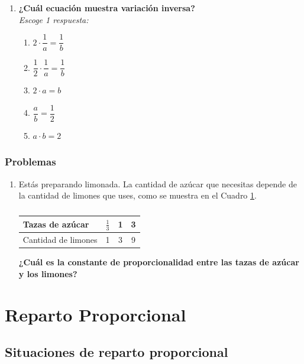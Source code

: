 \documentclass[11pt]{book}
\begin{document}
\begin{enumerate}[start=1]
  \item \textbf{¿Cuál ecuación muestra variación inversa?}\\
        \emph{Escoge 1 respuesta:}\\
        \begin{enumerate}
          \item $2\cdot \dfrac{1}{a}=\dfrac{1}{b}$
          \item $\dfrac{1}{2}\cdot \dfrac{1}{a}=\dfrac{1}{b}$
          \item $2\cdot a=b$
          \item $\dfrac{a}{b}=\dfrac{1}{2}$
          \item $a\cdot b=2$
        \end{enumerate}

\end{enumerate}

\newpage
\subsubsection{Problemas}

\begin{enumerate}
  \item Estás preparando limonada. La cantidad de azúcar que necesitas depende de la cantidad de limones que uses,
        como se muestra en el Cuadro \ref{tab:azucar_limon}.
        \begin{table}[!h]
          \label{tab:azucar_limon}
          \centering
          \begin{tabular}{|l|c|c|c|}
            \hline
            Tazas de azúcar     & $\frac{1}{3}$ & 1 & 3 \\
            \hline
            Cantidad de limones & 1             & 3 & 9 \\
            \hline
          \end{tabular}
          \caption{}
        \end{table}

        \textbf{¿Cuál es la constante de proporcionalidad entre las tazas de azúcar y los limones?}
\end{enumerate}
\section{Reparto Proporcional}
\subsection{Situaciones de reparto proporcional}
\end{document}
